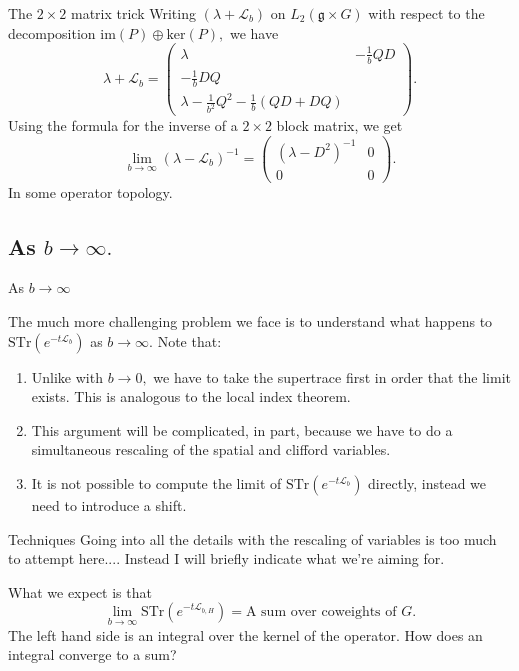 \documentclass{beamer}
\numberwithin{equation}{section}
\theoremstyle{plain}
\theoremstyle{plain}
\theoremstyle{definition}
\theoremstyle{plain}
\theoremstyle{plain}
\theoremstyle{definition}
\newcommand{\Lc}{\mathcal{L}}
\newcommand{\gf}{\mathfrak{g}}
\newcommand{\Str}{\mathrm{STr}}
\begin{document}
\begin{frame}{The $2\times 2$ matrix trick}
  Writing $(\lambda+\Lc_b)$ on $L_2(\gf\times G)$ with respect to the decomposition $\mathrm{im}(P)\oplus \mathrm{ker}(P),$ we have
  \[
      \lambda+\Lc_b = \begin{pmatrix} \lambda & -\frac1bQD \\ -\frac1bDQ \\ \lambda - \frac{1}{b^2}Q^2-\frac{1}{b}(QD+DQ)  \end{pmatrix}.
  \]
  Using the formula for the inverse of a $2\times 2$ block matrix, we get
  \[
    \lim_{b\to \infty} (\lambda-\Lc_b)^{-1} = \begin{pmatrix} (\lambda-D^2)^{-1} & 0 \\ 0 & 0\end{pmatrix}.
  \]
  In some operator topology.
\end{frame}

\subsection{As $b\to \infty.$}

\begin{frame}
  \huge{As $b\to\infty$}
\end{frame}

\begin{frame}
  The much more challenging problem we face is to understand what happens to $\Str(e^{-t\Lc_b})$ as $b\to\infty.$
  Note that:
  \begin{enumerate}
    \item{} Unlike with $b\to 0,$ we have to take the supertrace first in order that the limit exists. This is analogous to the local index theorem.
    \item{} This argument will be complicated, in part, because we have to do a simultaneous rescaling of the spatial and clifford variables.
    \item{} It is not possible to compute the limit of $\Str(e^{-t\Lc_b})$ directly, instead we need to introduce a shift.
  \end{enumerate}
\end{frame}

\begin{frame}{Techniques}
  Going into all the details with the rescaling of variables is too much to attempt here.... Instead I will briefly indicate what we're aiming for.

  What we expect is that
  \[
    \lim_{b\to\infty}\Str(e^{-t\Lc_{b,H}}) = \text{A sum over coweights of }G.
  \]
  The left hand side is an integral over the kernel of the operator. How does an integral converge to a sum?
\end{frame}
\end{document}
